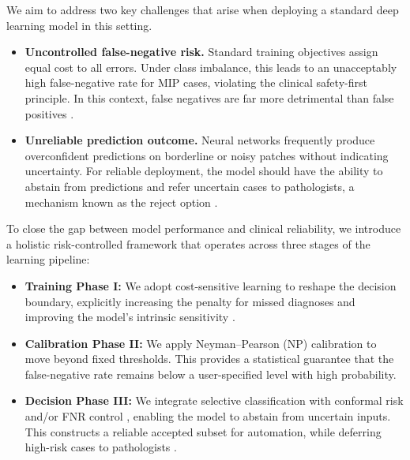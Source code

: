 \documentclass[journal,twoside,web]{ieeecolor}
\begin{document}
We aim to address two key challenges that arise when deploying a standard deep learning model in this setting.
\begin{itemize}
    \item \textbf{Uncontrolled false-negative risk.} Standard training objectives assign equal cost to all errors. Under class imbalance, this leads to an unacceptably high false-negative rate for MIP cases, violating the clinical safety-first principle. In this context, false negatives are far more detrimental than false positives \cite{he2009learning}.

    \item \textbf{Unreliable prediction outcome.} Neural networks frequently produce overconfident predictions on borderline or noisy patches without indicating uncertainty. For reliable deployment, the model should have the ability to abstain from predictions and refer uncertain cases to pathologists, a mechanism known as the reject option \cite{leibig2022combining}.
\end{itemize}

To close the gap between model performance and clinical reliability, we introduce a holistic risk-controlled framework that operates across three stages of the learning pipeline:

\begin{itemize}
\item \textbf{Training Phase I:} We adopt cost-sensitive learning to reshape the decision boundary, explicitly increasing the penalty for missed diagnoses and improving the model’s intrinsic sensitivity \cite{he2009learning}.
\item \textbf{Calibration Phase II:} We apply Neyman–Pearson (NP) calibration \cite{rigollet2011neyman,tong2018neyman} to move beyond fixed thresholds. This provides a statistical guarantee that the false-negative rate remains below a user-specified level with high probability.
\item \textbf{Decision Phase III:} We integrate selective classification with conformal risk and/or FNR control \cite{angelopoulos2022conformal}, enabling the model to abstain from uncertain inputs. This constructs a reliable accepted subset for automation, while deferring high-risk cases to pathologists \cite{geifman2019selectivenet,geifman2017selective}.
\end{itemize}
\end{document}
